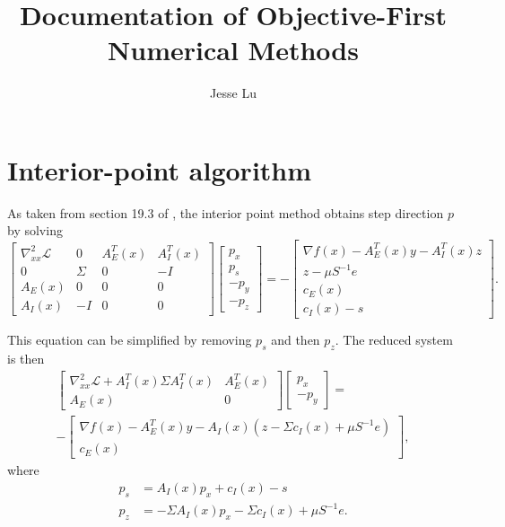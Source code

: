 \documentclass{article}
\begin{document}
\title{Documentation of Objective-First Numerical Methods}
\author{Jesse Lu}
\maketitle
\tableofcontents

\section{Interior-point algorithm}
As taken from section 19.3 of \cite{NW04}, 
    the interior point method obtains step direction $p$ by solving
\begin{equation}
\begin{bmatrix}
    \nabla^2_{xx}\mathcal{L} & 0 & A_E^T(x) & A_I^T(x) \\
    0 & \Sigma & 0 & -I \\
    A_E(x) & 0 & 0 & 0 \\
    A_I(x) & -I & 0 & 0
\end{bmatrix}
\begin{bmatrix} p_x \\ p_s \\ -p_y \\ -p_z \end{bmatrix}
    = -
\begin{bmatrix}
    \nabla f(x) - A_E^T(x) y - A_I^T(x) z \\
    z - \mu S^{-1} e \\
    c_E(x) \\
    c_I(x) - s
\end{bmatrix}.
\end{equation}

This equation can be simplified by removing $p_s$ and then $p_z$.
The reduced system is then
\begin{multline}
\begin{bmatrix}
    \nabla^2_{xx}\mathcal{L} + A_I^T(x) \Sigma A_I^T(x) & A_E^T(x) \\
    A_E(x) & 0 
\end{bmatrix}
\begin{bmatrix} p_x \\ -p_y \end{bmatrix}
    = \\ -
\begin{bmatrix}
    \nabla f(x) - A_E^T(x) y - A_I(x) (z - \Sigma c_I(x) + \mu S^{-1} e) \\
    c_E(x)
\end{bmatrix},
\end{multline}
where
\begin{align}
    p_s &= A_I(x) p_x + c_I(x) - s \\
    p_z &= -\Sigma A_I(x) p_x - \Sigma c_I(x) + \mu S^{-1} e.
\end{align}
\end{document}
